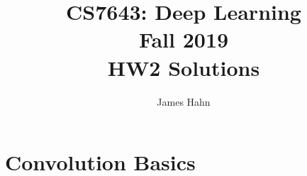 \documentclass[11pt,english]{article}
\begin{document}
\title{CS7643: Deep Learning \\
Fall 2019\\ HW2 Solutions}
\author{James Hahn}
\maketitle

\setcounter{MaxMatrixCols}{25}
\setlength\arraycolsep{1pt}


\section{Convolution Basics}
\end{document}
